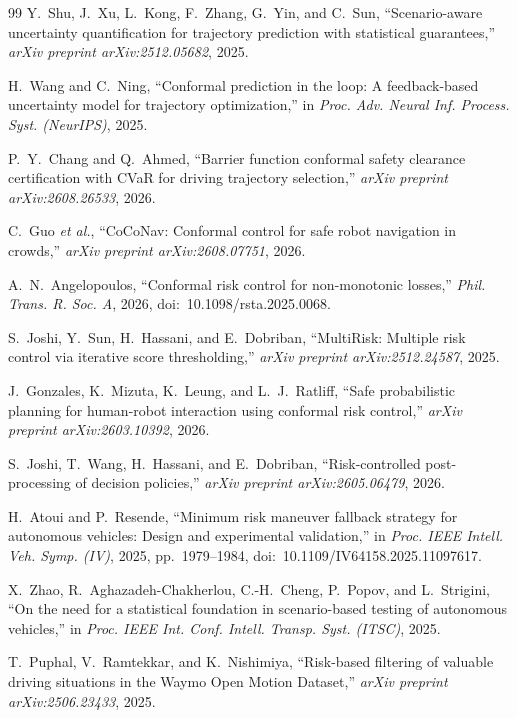\documentclass[lettersize,journal]{IEEEtran}
\begin{document}
\begin{thebibliography}{99}
Y.~Shu, J.~Xu, L.~Kong, F.~Zhang, G.~Yin, and C.~Sun, ``Scenario-aware
uncertainty quantification for trajectory prediction with statistical
guarantees,'' \emph{arXiv preprint arXiv:2512.05682}, 2025.

H.~Wang and C.~Ning, ``Conformal prediction in the loop: A
feedback-based uncertainty model for trajectory optimization,'' in
\emph{Proc. Adv. Neural Inf. Process. Syst. (NeurIPS)}, 2025.

P.~Y.~Chang and Q.~Ahmed, ``Barrier function conformal safety clearance
certification with CVaR for driving trajectory selection,'' \emph{arXiv
preprint arXiv:2608.26533}, 2026.

C.~Guo \emph{et al.}, ``CoCoNav: Conformal control for safe robot
navigation in crowds,'' \emph{arXiv preprint arXiv:2608.07751}, 2026.

A.~N.~Angelopoulos, ``Conformal risk control for non-monotonic losses,''
\emph{Phil. Trans. R. Soc. A}, 2026, doi:~10.1098/rsta.2025.0068.

S.~Joshi, Y.~Sun, H.~Hassani, and E.~Dobriban, ``MultiRisk: Multiple
risk control via iterative score thresholding,'' \emph{arXiv preprint
arXiv:2512.24587}, 2025.

J.~Gonzales, K.~Mizuta, K.~Leung, and L.~J.~Ratliff, ``Safe
probabilistic planning for human-robot interaction using conformal risk
control,'' \emph{arXiv preprint arXiv:2603.10392}, 2026.

S.~Joshi, T.~Wang, H.~Hassani, and E.~Dobriban, ``Risk-controlled
post-processing of decision policies,'' \emph{arXiv preprint
arXiv:2605.06479}, 2026.

H.~Atoui and P.~Resende, ``Minimum risk maneuver fallback strategy for
autonomous vehicles: Design and experimental validation,'' in
\emph{Proc. IEEE Intell. Veh. Symp. (IV)}, 2025, pp.~1979--1984,
doi:~10.1109/IV64158.2025.11097617.

X.~Zhao, R.~Aghazadeh-Chakherlou, C.-H.~Cheng, P.~Popov, and
L.~Strigini, ``On the need for a statistical foundation in
scenario-based testing of autonomous vehicles,'' in \emph{Proc. IEEE Int.
Conf. Intell. Transp. Syst. (ITSC)}, 2025.

T.~Puphal, V.~Ramtekkar, and K.~Nishimiya, ``Risk-based filtering of
valuable driving situations in the Waymo Open Motion Dataset,''
\emph{arXiv preprint arXiv:2506.23433}, 2025.


\end{thebibliography}
\end{document}

